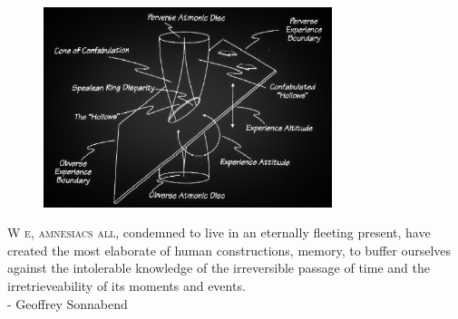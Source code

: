 \newpage

\begin{figure}
  \vspace{50pt}
  \centering
    \includegraphics[width=0.75\textwidth]{endmatter/colophon.png}
\end{figure}


\begin{center}
\parbox{200pt}{\lettrine[lines=3,slope=-2pt,nindent=-4pt]{\textcolor{SchoolColor}{W}}{ e, amnesiacs all,} condemned to live in an eternally fleeting present, have created the most elaborate of human constructions, memory, to buffer ourselves against the intolerable knowledge of the irreversible passage of time and the irretrieveability of its moments and events. \\ - Geoffrey Sonnabend}
\end{center}
